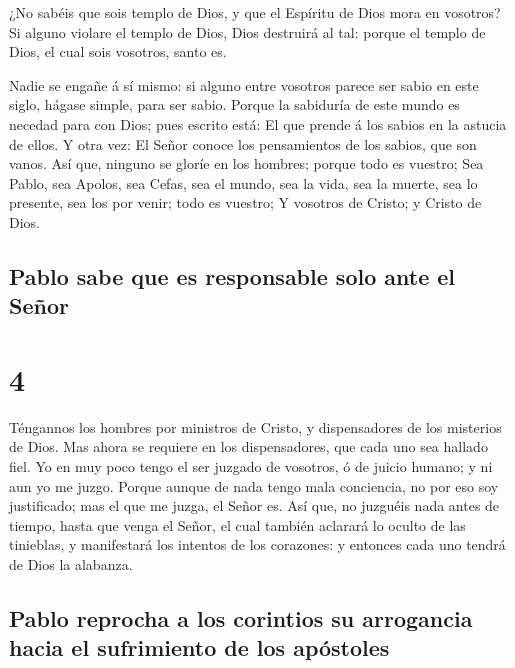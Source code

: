  ¿No sabéis que sois templo de Dios, y que el Espíritu de
Dios mora en vosotros?  Si alguno violare el templo de
Dios, Dios destruirá al tal: porque el templo de Dios, el cual sois
vosotros, santo es.

 Nadie se engañe á sí mismo: si alguno entre vosotros
parece ser sabio en este siglo, hágase simple, para ser sabio.
 Porque la sabiduría de este mundo es necedad para con
Dios; pues escrito está: El que prende á los sabios en la astucia de
ellos.  Y otra vez: El Señor conoce los pensamientos de los
sabios, que son vanos.  Así que, ninguno se gloríe en los
hombres; porque todo es vuestro;  Sea Pablo, sea Apolos,
sea Cefas, sea el mundo, sea la vida, sea la muerte, sea lo presente,
sea los por venir; todo es vuestro;  Y vosotros de Cristo;
y Cristo de Dios.

\hypertarget{pablo-sabe-que-es-responsable-solo-ante-el-seuxf1or}{%
\subsection{Pablo sabe que es responsable solo ante el
Señor}\label{pablo-sabe-que-es-responsable-solo-ante-el-seuxf1or}}

\hypertarget{section-3}{%
\section{4}\label{section-3}}

 Téngannos los hombres por ministros de Cristo, y
dispensadores de los misterios de Dios.  Mas ahora se
requiere en los dispensadores, que cada uno sea hallado fiel.
 Yo en muy poco tengo el ser juzgado de vosotros, ó de
juicio humano; y ni aun yo me juzgo.  Porque aunque de nada
tengo mala conciencia, no por eso soy justificado; mas el que me juzga,
el Señor es.  Así que, no juzguéis nada antes de tiempo,
hasta que venga el Señor, el cual también aclarará lo oculto de las
tinieblas, y manifestará los intentos de los corazones: y entonces cada
uno tendrá de Dios la alabanza.

\hypertarget{pablo-reprocha-a-los-corintios-su-arrogancia-hacia-el-sufrimiento-de-los-apuxf3stoles}{%
\subsection{Pablo reprocha a los corintios su arrogancia hacia el
sufrimiento de los
apóstoles}\label{pablo-reprocha-a-los-corintios-su-arrogancia-hacia-el-sufrimiento-de-los-apuxf3stoles}}

